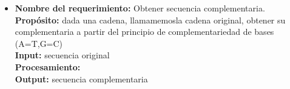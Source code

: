 \documentclass[12pt,a4paper,english,spanish]{article}
\begin{document}
	\begin{itemize}
		\item \textbf{Nombre del requerimiento:} Obtener secuencia complementaria.\\
			  \textbf{Propósito:} dada una cadena, llamamemosla cadena original, obtener su complementaria a partir del principio de complementariedad de 									bases (A=T,G=C)\\
			  \textbf{Input:} secuencia original\\
			  \textbf{Procesamiento:} \\
			  \textbf{Output:} secuencia complementaria\\







\end{itemize}
\end{document}
